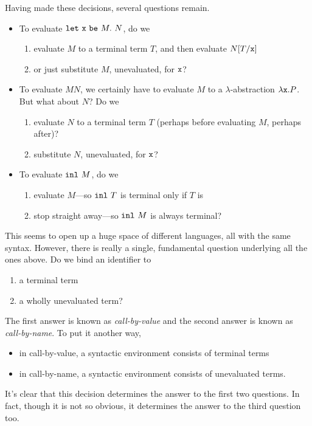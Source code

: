 \documentclass[runningheads,12pt]{llncs}
\newcommand{\ttletmac}[2]{\mathtt{let}\ {#2}\ \mathtt{be}\ {#1}.\ }
\begin{document}
Having made these decisions, several questions remain.
\begin{itemize}
\item To evaluate $\ttletmac{ M }{ \ttx } N$, do we
  \begin{enumerate}
  \item evaluate $M$ to a terminal term $T$, and then evaluate $N[T/\mathtt{x}]$
  \item or just substitute $M$, unevaluated, for $\mathtt{x}$?
  \end{enumerate}
\item To evaluate $MN$, we certainly have to evaluate $M$ to a $\lambda$-abstraction $\lambda \mathtt{x}. P$.  But what about $N$?  Do we 
  \begin{enumerate}
  \item evaluate $N$ to a terminal term $T$ (perhaps before evaluating $M$, perhaps after)?  
  \item substitute $N$, unevaluated, for $\mathtt{x}$?
    \end{enumerate}
\item To evaluate $\mathtt{inl} \  {M}$, do we 
  \begin{enumerate}
   \item evaluate $M$---so $\mathtt{inl} \  {T}$ is terminal only if $T$ is
 \item stop straight away---so $\mathtt{inl} \  {M}$ is always terminal?
  \end{enumerate}
\end{itemize}

This seems to open up a huge space of different languages, all with the same syntax.  However, there is really a single, fundamental question underlying all the ones above.  Do we bind an identifier to 
\begin{enumerate}
\item a terminal term
\item a wholly unevaluated term?
\end{enumerate}
The first answer is known as \emph{call-by-value} and the second answer is known as \emph{call-by-name}.  To put it another way,
\begin{itemize}
\item in call-by-value, a syntactic environment consists of terminal terms
\item in call-by-name, a syntactic environment consists of unevaluated terms.
\end{itemize}
It's clear that this decision determines the answer to the first two questions.  In fact, though it is not so obvious, it determines the answer to the third question too.  
\end{document}
